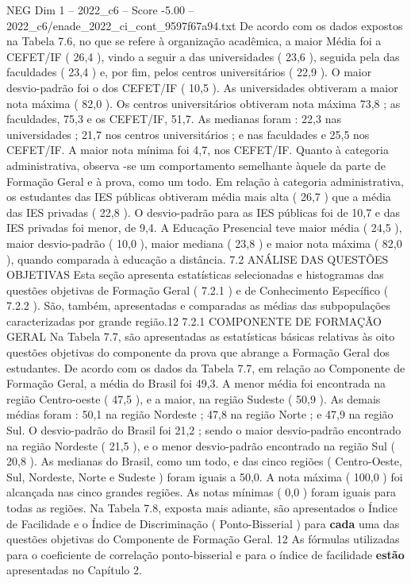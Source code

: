 \begin{textsample}{NEG Dim 1 – 2022\_c6 – Score -5.00 – 2022\_c6/enade\_2022\_ci\_cont\_9597f67a94.txt}
De acordo com os dados expostos na Tabela 7.6, no que se refere à organização acadêmica, a maior Média foi a CEFET/IF ( 26,4 ), vindo a seguir a das universidades ( 23,6 ), seguida pela das faculdades ( 23,4 ) e, por fim, pelos centros universitários ( 22,9 ).
O maior desvio-padrão foi o dos CEFET/IF ( 10,5 ).
As universidades obtiveram a maior nota máxima ( 82,0 ).
Os centros universitários obtiveram nota máxima 73,8 ; as faculdades, 75,3 e os CEFET/IF, 51,7.
As medianas foram : 22,3 nas universidades ; 21,7 nos centros universitários ; e nas faculdades e 25,5 nos CEFET/IF.
A maior nota mínima foi 4,7, nos CEFET/IF.
Quanto à categoria administrativa, observa -se um comportamento semelhante àquele da parte de Formação Geral e à prova, como um todo.
Em relação à categoria administrativa, os estudantes das IES públicas obtiveram média mais alta ( 26,7 ) que a média das IES privadas ( 22,8 ).
O desvio-padrão para as IES públicas foi de 10,7 e das IES privadas foi menor, de 9,4.
A Educação Presencial teve maior média ( 24,5 ), maior desvio-padrão ( 10,0 ), maior mediana ( 23,8 ) e maior nota máxima ( 82,0 ), quando comparada à educação a distância. 7.2 ANÁLISE DAS QUESTÕES OBJETIVAS Esta seção apresenta estatísticas selecionadas e histogramas das questões objetivas de Formação Geral ( 7.2.1 ) e de Conhecimento Específico ( 7.2.2 ).
São, também, apresentadas e comparadas as médias das subpopulações caracterizadas por grande região.12 7.2.1 COMPONENTE DE FORMAÇÃO GERAL Na Tabela 7.7, são apresentadas as estatísticas básicas relativas às oito questões objetivas do componente da prova que abrange a Formação Geral dos estudantes.
De acordo com os dados da Tabela 7.7, em relação ao Componente de Formação Geral, a média do Brasil foi 49,3.
A menor média foi encontrada na região Centro-oeste ( 47,5 ), e a maior, na região Sudeste ( 50,9 ).
As demais médias foram : 50,1 na região Nordeste ; 47,8 na região Norte ; e 47,9 na região Sul.
O desvio-padrão do Brasil foi 21,2 ; sendo o maior desvio-padrão encontrado na região Nordeste ( 21,5 ), e o menor desvio-padrão encontrado na região Sul ( 20,8 ).
As medianas do Brasil, como um todo, e das cinco regiões ( Centro-Oeste, Sul, Nordeste, Norte e Sudeste ) foram iguais a 50,0.
A nota máxima ( 100,0 ) foi alcançada nas cinco grandes regiões.
As notas mínimas ( 0,0 ) foram iguais para todas as regiões.
Na Tabela 7.8, exposta mais adiante, são apresentados o Índice de Facilidade e o Índice de Discriminação ( Ponto-Bisserial ) para \textbf{cada} uma das questões objetivas do Componente de Formação Geral. 12 As fórmulas utilizadas para o coeficiente de correlação ponto-bisserial e para o índice de facilidade \textbf{estão} apresentadas no Capítulo 2.

\end{textsample}
